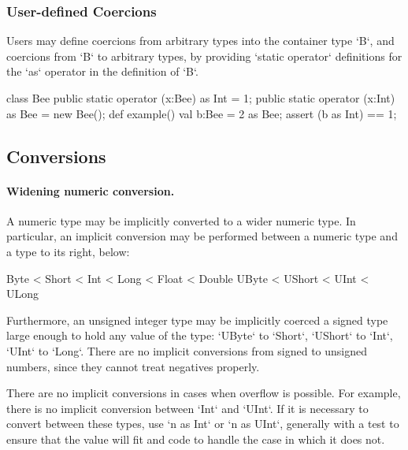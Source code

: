 \subsubsection{User-defined Coercions}

Users may define coercions from arbitrary types into the container type
\xcd`B`, and coercions from \xcd`B` to arbitrary types, by providing
\xcd`static operator` definitions for the \xcd`as` operator in the definition of
\xcd`B`.  

\begin{ex}

\begin{xten}
class Bee {
  public static operator (x:Bee) as Int = 1;
  public static operator (x:Int) as Bee = new Bee();
  def example() {
    val b:Bee = 2 as Bee; 
    assert (b as Int) == 1;
  }
}
\end{xten}
%


\end{ex}



\subsection{Conversions}

\paragraph{Widening numeric conversion.}
\label{WideningConversions}
A numeric type may be implicitly converted to a wider numeric type. In
particular, an implicit conversion may be performed between a numeric
type and a type to its right, below:

\begin{xten}
Byte < Short < Int < Long < Float < Double
UByte < UShort < UInt < ULong
\end{xten}

Furthermore, an unsigned integer type may be implicitly coerced a signed type
large 
enough to hold any value of the type: \xcd`UByte` to \xcd`Short`, \xcd`UShort`
to \xcd`Int`, \xcd`UInt` to \xcd`Long`.  There are no implicit conversions
from signed to unsigned numbers, since they cannot treat negatives properly.

There are no implicit conversions in cases when overflow is possible.  For
example, there is no implicit conversion between \xcd`Int` and \xcd`UInt`.  If
it is necessary to convert between these types, use \xcd`n as Int` or 
\xcd`n as UInt`, generally with a test to ensure that the value will fit and
code to handle the case in which it does not.  


